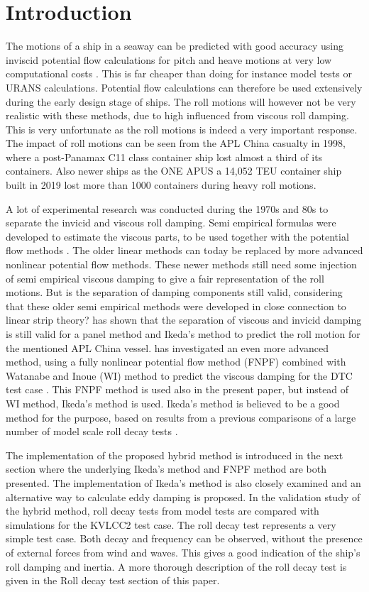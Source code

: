 \section{Introduction}\label{introduction}

The motions of a ship in a seaway can be predicted with good accuracy
using inviscid potential flow calculations for pitch and heave motions
at very low computational costs \cite{7505983/FB64RGPF}. This is far
cheaper than doing for instance model tests or URANS calculations.
Potential flow calculations can therefore be used extensively during the
early design stage of ships. The roll motions will however not be very
realistic with these methods, due to high influenced from viscous roll
damping. This is very unfortunate as the roll motions is indeed a very
important response. The impact of roll motions can be seen from the APL
China casualty in 1998, where a post-Panamax C11 class container ship
lost almost a third of its containers. Also newer ships as the ONE APUS
a 14,052 TEU container ship built in 2019 lost more than 1000 containers
during heavy roll motions.

A lot of experimental research was conducted during the 1970s and 80s to
separate the invicid and viscous roll damping. Semi empirical formulas
were developed to estimate the viscous parts, to be used together with
the potential flow methods \cite{7505983/937PN5DT}. The older linear
methods can today be replaced by more advanced nonlinear potential flow
methods. These newer methods still need some injection of semi empirical
viscous damping to give a fair representation of the roll motions. But
is the separation of damping components still valid, considering that
these older semi empirical methods were developed in close connection to
linear strip theory? \cite{7505983/UGK6YEVD} has shown that the
separation of viscous and invicid damping is still valid for a panel
method and Ikeda's method to predict the roll motion for the mentioned
APL China vessel. \cite{7505983/24TNAV5Z} has investigated an even more
advanced method, using a fully nonlinear potential flow method (FNPF)
combined with Watanabe and Inoue (WI) method to predict the viscous
damping for the DTC test case \cite{7505983/BYNJ8CFG}. This FNPF method
is used also in the present paper, but instead of WI method, Ikeda's
method is used. Ikeda's method is believed to be a good method for the
purpose, based on results from a previous comparisons of a large number
of model scale roll decay tests \cite{7505983/QMGQ76Q9}.

The implementation of the proposed hybrid method is introduced in the
next section where the underlying Ikeda's method and FNPF method are
both presented. The implementation of Ikeda's method is also closely
examined and an alternative way to calculate eddy damping is proposed.
In the validation study of the hybrid method, roll decay tests from
model tests are compared with simulations for the KVLCC2 test case. The
roll decay test represents a very simple test case. Both decay and
frequency can be observed, without the presence of external forces from
wind and waves. This gives a good indication of the ship's roll damping
and inertia. A more thorough description of the roll decay test is given
in the Roll decay test section of this paper.

    